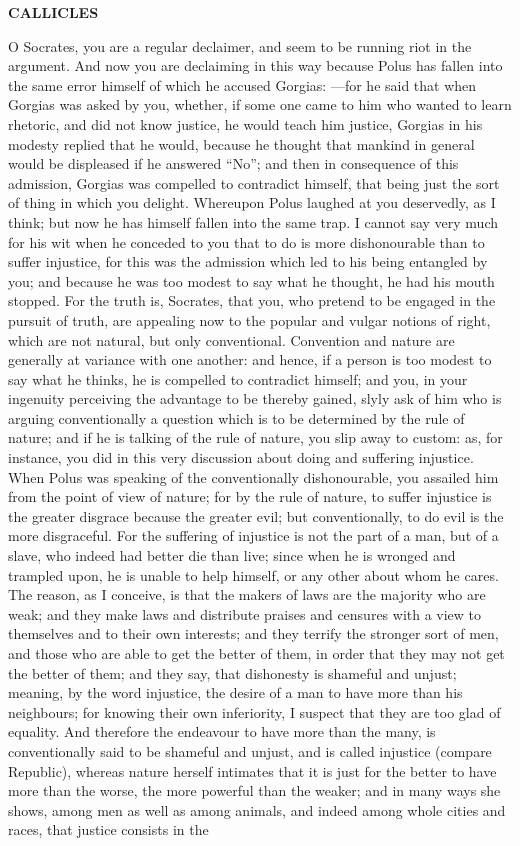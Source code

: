 \documentclass[11pt,letter]{article}
\begin{document}
\par \textbf{CALLICLES}
\par   O Socrates, you are a regular declaimer, and seem to be running riot in the argument. And now you are declaiming in this way because Polus has fallen into the same error himself of which he accused Gorgias: —for he said that when Gorgias was asked by you, whether, if some one came to him who wanted to learn rhetoric, and did not know justice, he would teach him justice, Gorgias in his modesty replied that he would, because he thought that mankind in general would be displeased if he answered “No”; and then in consequence of this admission, Gorgias was compelled to contradict himself, that being just the sort of thing in which you delight. Whereupon Polus laughed at you deservedly, as I think; but now he has himself fallen into the same trap. I cannot say very much for his wit when he conceded to you that to do is more dishonourable than to suffer injustice, for this was the admission which led to his being entangled by you; and because he was too modest to say what he thought, he had his mouth stopped. For the truth is, Socrates, that you, who pretend to be engaged in the pursuit of truth, are appealing now to the popular and vulgar notions of right, which are not natural, but only conventional. Convention and nature are generally at variance with one another:  and hence, if a person is too modest to say what he thinks, he is compelled to contradict himself; and you, in your ingenuity perceiving the advantage to be thereby gained, slyly ask of him who is arguing conventionally a question which is to be determined by the rule of nature; and if he is talking of the rule of nature, you slip away to custom:  as, for instance, you did in this very discussion about doing and suffering injustice. When Polus was speaking of the conventionally dishonourable, you assailed him from the point of view of nature; for by the rule of nature, to suffer injustice is the greater disgrace because the greater evil; but conventionally, to do evil is the more disgraceful. For the suffering of injustice is not the part of a man, but of a slave, who indeed had better die than live; since when he is wronged and trampled upon, he is unable to help himself, or any other about whom he cares. The reason, as I conceive, is that the makers of laws are the majority who are weak; and they make laws and distribute praises and censures with a view to themselves and to their own interests; and they terrify the stronger sort of men, and those who are able to get the better of them, in order that they may not get the better of them; and they say, that dishonesty is shameful and unjust; meaning, by the word injustice, the desire of a man to have more than his neighbours; for knowing their own inferiority, I suspect that they are too glad of equality. And therefore the endeavour to have more than the many, is conventionally said to be shameful and unjust, and is called injustice (compare Republic), whereas nature herself intimates that it is just for the better to have more than the worse, the more powerful than the weaker; and in many ways she shows, among men as well as among animals, and indeed among whole cities and races, that justice consists in the 
\end{document}
